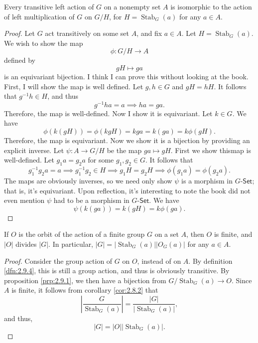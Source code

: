 \begin{proposition}\label{prp:2.9.1}
	Every transitive left action of $G$ on a nonempty set $A$ is isomorphic to the action of left multiplication of $G$ on $G / H$, for $H= \operatorname{Stab}_G(a) $ for any $a\in A$.
\end{proposition}
\begin{proof}
	Let $G$ act transitively on some set $A$, and fix $a\in A$. Let $H=\operatorname{Stab}_G(a) $. We wish to show the map
	\[
		\phi : G /H \to A
	\]
	defined by
	\[
		gH\mapsto ga
	\]
	is an equivariant bijection. I think I can prove this without looking at the book. First, I will show the map is well defined. Let $g,h\in G$ and $gH=hH$. It follows that $g^{-1}h\in H$, and thus
	\[
		g^{-1}ha = a \implies ha=ga
	.\]
	Therefore, the map is well-defined. Now I show it is equivariant. Let $k\in G$. We have
	\[
		\phi (k(gH))=\phi (kgH)=kga=k(ga)=k\phi (gH)
	.\]
	Therefore, the map is equivariant. Now we show it is a bijection by providing an explicit inverse. Let $\psi : A \to G /H$ be the map $ga\mapsto gH$. First we show thismap is well-defined. Let $g_1a=g_2a$ for some $g_1,g_2\in G$. It follows that
	\[
		g_1^{-1}g_2a=a \implies g_1^{-1}g_2\in H \implies g_1H=g_2H \implies \phi (g_1a)=\phi (g_2a)
	.\]
	The maps are obviously inverses, so we need only show $\psi $ is a morphism in $G$-$\mathsf{Set}$; that is, it's equivariant. Upon reflection, it's interesting to note the book did not even mention $\psi $ had to be a morphism in $G$-$\mathsf{Set}$. We have
	\[
		\psi (k(ga))=k(gH)=k\phi (ga)
	.\]
\end{proof}
\begin{corollary}\label{cor:2.9.1}
	If $O$ is the orbit of the action of a finite group $G$ on a set $A$, then $O$ is finite, and $\left| O \right| $ divides $\left| G \right| $. In particular, $\left| G \right| =\left| \operatorname{Stab}_G(a)  \right| \left| O_G(a) \right| $ for any $a\in A$.
\end{corollary}
\begin{proof}
	Consider the group action of $G$ on $O$, instead of on $A$. By definition  \ref{dfn:2.9.4}, this is still a group action, and thus is obviously transitive. By proposition \ref{prp:2.9.1}, we then have a bijection from $G / \operatorname{Stab}_G(a) \to O$. Since $A$ is finite, it follows from corollary \ref{cor:2.8.2} that
	\[
		\left| \frac{G}{\operatorname{Stab}_G(a) } \right| =\frac{\left| G \right| }{\left| \operatorname{Stab}_G(a)  \right| }
	,\]
	and thus,
	\[
		\left| G \right| =\left| O \right| \left| \operatorname{Stab}_G(a)  \right| 
	.\]
\end{proof}

